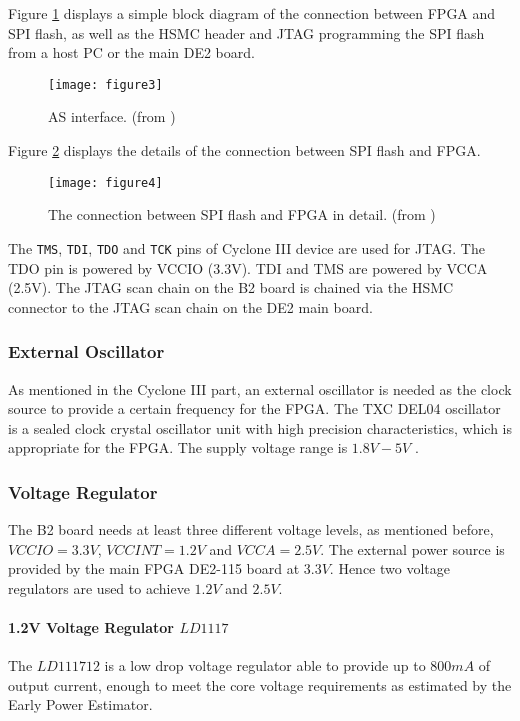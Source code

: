 Figure \ref{fig:b2_f3} displays a simple block diagram of the connection between FPGA and SPI flash,
as well as the HSMC header and JTAG programming the SPI flash from a host PC or the main DE2 board.

\begin{figure}
 \centering
 \texttt{[image: figure3]}
 \caption{AS interface. (from \citep{Spansion:2011:appnote})}
 \label{fig:b2_f3}
\end{figure}


Figure \ref{fig:b2_f4} displays the details of the connection between SPI flash and FPGA.

\begin{figure}
 \centering
 \texttt{[image: figure4]}
 \caption{The connection between SPI flash and FPGA in detail. (from \citep{Spansion:2011:appnote})}
 \label{fig:b2_f4}
\end{figure}

The \texttt{TMS}, \texttt{TDI}, \texttt{TDO} and \texttt{TCK} pins of Cyclone III device are
used for JTAG. The TDO pin is powered by VCCIO (3.3V). TDI and TMS are powered by VCCA (2.5V). The JTAG
scan chain on the B2 board is chained via the HSMC connector to the JTAG scan chain on the DE2 main board.


\subsubsection{External Oscillator}

As mentioned in the Cyclone III part, an external oscillator is needed as the clock source to provide a certain frequency for the FPGA.
The TXC DEL04 oscillator is a sealed clock crystal oscillator unit with high precision characteristics, which is appropriate for the FPGA.
The supply voltage range is $1.8V-5V$ \citep{TXC:osc_datasheet}.


\subsubsection{Voltage Regulator}
The B2 board needs at least three different voltage levels, as mentioned before, $VCCIO=3.3V$, $VCCINT= 1.2V$ and $VCCA=2.5V$.
The external power source is provided by the main FPGA DE2-115 board at $3.3V$. Hence two voltage regulators are used to achieve $1.2V$ and $2.5V$.

\paragraph{1.2V Voltage Regulator \texorpdfstring{$LD1117$}{LD1117}}
The $LD111712$ is a low drop voltage regulator able to provide up to $800mA$ of output current, enough to meet the
core voltage requirements as estimated by the Early Power Estimator.

